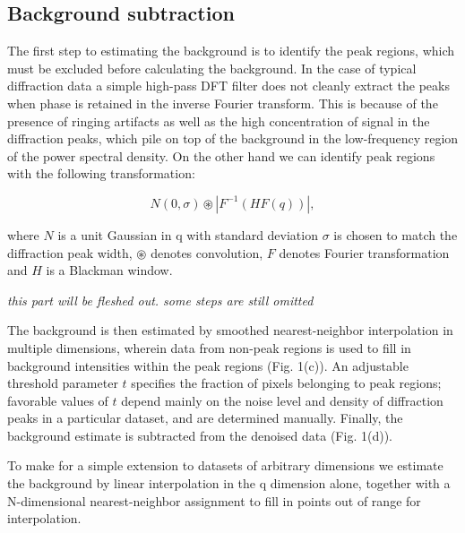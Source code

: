 \documentclass[12pt]{iopart}
\begin{document}
\subsection{Background subtraction}
The first step to estimating the background is to identify the peak
regions, which must be excluded before calculating the background. In
the case of typical diffraction data a simple high-pass DFT filter does
not cleanly extract the peaks when phase is retained in the inverse
Fourier transform. This is because of the presence of ringing artifacts
as well as the high concentration of signal in the diffraction peaks,
which pile on top of the background in the low-frequency region of the
power spectral density. On the other hand we can identify peak regions
with the following transformation:


\begin{equation}
N(0, \sigma) \circledast |{F}^{-1}(H  {F}(q))|,
\end{equation}

where $N$ is a unit Gaussian in q with standard deviation $\sigma$
is chosen to match the diffraction peak width, $\circledast$ denotes
convolution, $F$ denotes Fourier transformation and $H$ is a Blackman window.

\emph{this part will be fleshed out. some steps are still omitted}

The background is then estimated by smoothed nearest-neighbor interpolation in multiple dimensions, wherein data from non-peak regions is used to
fill in background intensities within the peak regions (Fig. 1(c)). An adjustable threshold parameter $t$ specifies the fraction of pixels belonging to peak regions; favorable values of $t$ depend mainly on the noise level and density of diffraction peaks in a particular dataset, and are determined manually. 
Finally, the background estimate is subtracted from the denoised data (Fig. 1(d)).

To make for a simple extension to datasets of arbitrary dimensions we
estimate the background by linear interpolation in the q dimension
alone, together with a N-dimensional nearest-neighbor assignment to
fill in points out of range for interpolation.
\end{document}

